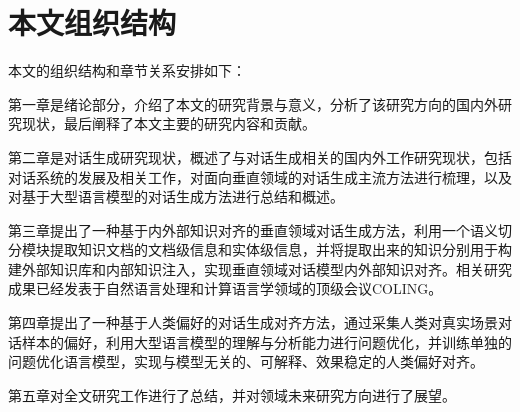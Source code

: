 \section{本文组织结构}

本文的组织结构和章节关系安排如下：

第一章是绪论部分，介绍了本文的研究背景与意义，分析了该研究方向的国内外研究现状，最后阐释了本文主要的研究内容和贡献。

第二章是对话生成研究现状，概述了与对话生成相关的国内外工作研究现状，包括对话系统的发展及相关工作，对面向垂直领域的对话生成主流方法进行梳理，以及对基于大型语言模型的对话生成方法进行总结和概述。

第三章提出了一种基于内外部知识对齐的垂直领域对话生成方法，利用一个语义切分模块提取知识文档的文档级信息和实体级信息，并将提取出来的知识分别用于构建外部知识库和内部知识注入，实现垂直领域对话模型内外部知识对齐。相关研究成果已经发表于自然语言处理和计算语言学领域的顶级会议COLING。

第四章提出了一种基于人类偏好的对话生成对齐方法，通过采集人类对真实场景对话样本的偏好，利用大型语言模型的理解与分析能力进行问题优化，并训练单独的问题优化语言模型，实现与模型无关的、可解释、效果稳定的人类偏好对齐。

第五章对全文研究工作进行了总结，并对领域未来研究方向进行了展望。
